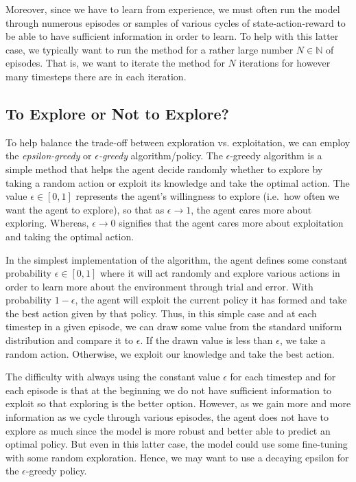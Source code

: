 Moreover, since we have to learn from experience, we must often run the model through numerous episodes or samples of various cycles of state-action-reward to be able to have sufficient information in order to learn.
To help with this latter case, we typically want to run the method for a rather large number $N\in\mathbb{N}$ of episodes.
That is, we want to iterate the method for $N$ iterations for however many timesteps there are in each iteration.

\subsection*{To Explore or Not to Explore?}
To help balance the trade-off between exploration vs. exploitation, we can employ the \emph{epsilon-greedy} or \emph{$\epsilon$-greedy} algorithm/policy.
The $\epsilon$-greedy algorithm is a simple method that helps the agent decide randomly whether to explore by taking a random action or exploit its knowledge and take the optimal action.
The value $\epsilon\in[0,1]$ represents the agent's willingness to explore (i.e.\ how often we want the agent to explore), so that as $\epsilon\to1$, the agent cares more about exploring.
Whereas, $\epsilon\to0$ signifies that the agent cares more about exploitation and taking the optimal action.

In the simplest implementation of the algorithm, the agent defines some constant probability $\epsilon\in[0,1]$ where it will act randomly and explore various actions in order to learn more about the environment through trial and error.
With probability $1-\epsilon$, the agent will exploit the current policy it has formed and take the best action given by that policy.
Thus, in this simple case and at each timestep in a given episode, we can draw some value from the standard uniform distribution and compare it to $\epsilon$.
If the drawn value is less than $\epsilon$, we take a random action.
Otherwise, we exploit our knowledge and take the best action.

The difficulty with always using the constant value $\epsilon$ for each timestep and for each episode is that at the beginning we do not have sufficient information to exploit so that exploring is the better option.
However, as we gain more and more information as we cycle through various episodes, the agent does not have to explore as much since the model is more robust and better able to predict an optimal policy.
But even in this latter case, the model could use some fine-tuning with some random exploration.
Hence, we may want to use a decaying epsilon for the $\epsilon$-greedy policy.

